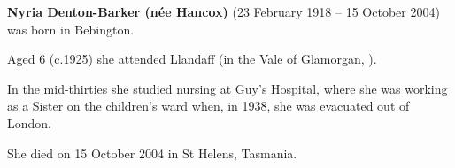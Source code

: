 
\textbf{Nyria Denton-Barker (n\'{e}e Hancox)} (23 February 1918 -- 15 October 2004) was born in Bebington.\cite{BMDIndex_JoanNyriaHancox_birth}

Aged 6 (c.1925) she attended  Llandaff (in the Vale of Glamorgan, ).\cite{OralHistoryJDB2008}

In the mid-thirties she studied nursing at Guy's Hospital, where she was working as a Sister on the children's ward when, in 1938, she was evacuated out of London.

She died on 15 October 2004 in St Helens, Tasmania.
